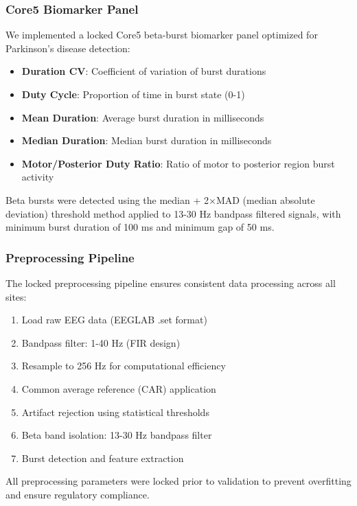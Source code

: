 \documentclass[11pt]{article}
\begin{document}
\subsubsection{Core5 Biomarker Panel}

We implemented a locked Core5 beta-burst biomarker panel optimized for Parkinson's disease detection:
\begin{itemize}
\item \textbf{Duration CV}: Coefficient of variation of burst durations
\item \textbf{Duty Cycle}: Proportion of time in burst state (0-1)
\item \textbf{Mean Duration}: Average burst duration in milliseconds
\item \textbf{Median Duration}: Median burst duration in milliseconds
\item \textbf{Motor/Posterior Duty Ratio}: Ratio of motor to posterior region burst activity
\end{itemize}

Beta bursts were detected using the median + 2×MAD (median absolute deviation) threshold method applied to 13-30 Hz bandpass filtered signals, with minimum burst duration of 100 ms and minimum gap of 50 ms\cite{shin2017dynamics,west2021motor}.

\subsubsection{Preprocessing Pipeline}

The locked preprocessing pipeline ensures consistent data processing across all sites:
\begin{enumerate}
\item Load raw EEG data (EEGLAB .set format)
\item Bandpass filter: 1-40 Hz (FIR design)
\item Resample to 256 Hz for computational efficiency
\item Common average reference (CAR) application
\item Artifact rejection using statistical thresholds
\item Beta band isolation: 13-30 Hz bandpass filter
\item Burst detection and feature extraction
\end{enumerate}

All preprocessing parameters were locked prior to validation to prevent overfitting and ensure regulatory compliance.
\end{document}
